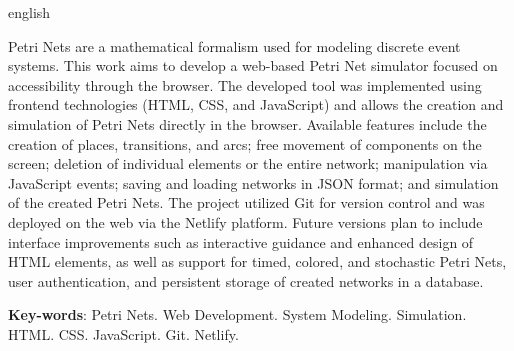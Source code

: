 \documentclass[
	12pt,				%
	openright,			%
	oneside,			%
	a4paper,			%
	english,			%
	brazil				%
	]{abntex2}
\begin{document}
\begin{resumo}[Abstract]
 \begin{otherlanguage*}{english}

\noindent 

Petri Nets are a mathematical formalism used for modeling discrete event systems. This work aims to develop a web-based Petri Net simulator focused on accessibility through the browser. The developed tool was implemented using frontend technologies (HTML, CSS, and JavaScript) and allows the creation and simulation of Petri Nets directly in the browser. Available features include the creation of places, transitions, and arcs; free movement of components on the screen; deletion of individual elements or the entire network; manipulation via JavaScript events; saving and loading networks in JSON format; and simulation of the created Petri Nets. The project utilized Git for version control and was deployed on the web via the Netlify platform. Future versions plan to include interface improvements such as interactive guidance and enhanced design of HTML elements, as well as support for timed, colored, and stochastic Petri Nets, user authentication, and persistent storage of created networks in a database.

   \vspace{\onelineskip}

   \noindent
   \textbf{Key-words}: Petri Nets. Web Development. System Modeling. Simulation. HTML. CSS. JavaScript. Git. Netlify.
 \end{otherlanguage*}
\end{resumo}


\listoffigures*
\cleardoublepage


\cleardoublepage
{} %
\renewcommand{\lstlistlistingname}{Lista de Códigos}
\lstlistoflistings %
\cleardoublepage




\end{document}
